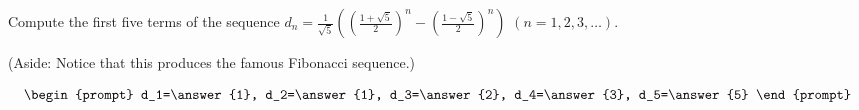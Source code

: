 \documentclass{ximera}
\author{Gregory Hartman \and Matthew Carr}
\begin{document}
\begin{exercise}





Compute the first five terms of the sequence $d_n=\frac{1}{\sqrt{5}}\left(\left(\frac{1+\sqrt{5}}{2}\right)^n-\left(\frac{1-\sqrt{5}}{2}\right)^n\right)$ $(n=1,2,3,\ldots)$.

(Aside: Notice that this produces the famous Fibonacci sequence.)

\[
\begin{prompt}
d_1=\answer{1}, d_2=\answer{1}, d_3=\answer{2}, d_4=\answer{3}, d_5=\answer{5}
\end{prompt}
\]

\end{exercise}
\end{document}
